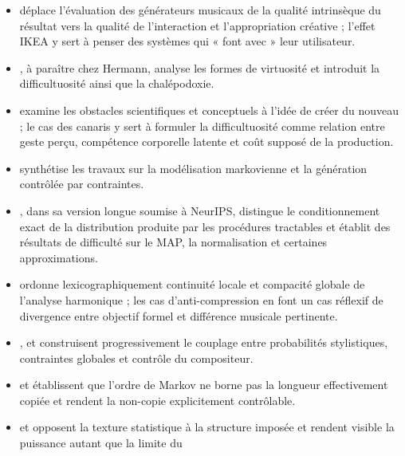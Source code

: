 \documentclass[11pt,a4paper]{article}
\begin{document}
\begin{itemize}
  \item \textcite{pachet2026generation} déplace l'évaluation des générateurs
        musicaux de la qualité intrinsèque du résultat vers la qualité de
        l'interaction et l'appropriation créative ; l'effet IKEA y sert à penser
        des systèmes qui « font avec » leur utilisateur.
  \item \textcite{pachet2027virtuosite}, à paraître chez Hermann, analyse les
        formes de virtuosité et introduit la difficultuosité ainsi que la
        chalépodoxie.
  \item \textcite{pachet2026impossibilite} examine les obstacles scientifiques
        et conceptuels à l'idée de créer du nouveau ; le cas des canaris y sert à
        formuler la difficultuosité comme relation entre geste perçu, compétence
        corporelle latente et coût supposé de la production.
  \item \textcite{pachet2026markov} synthétise les travaux sur la modélisation
        markovienne et la génération contrôlée par contraintes.
  \item \textcite{pachet2026biases}, dans sa version longue soumise à NeurIPS,
        distingue le conditionnement exact de la distribution produite par les
        procédures tractables et établit des résultats de difficulté sur le MAP,
        la normalisation et certaines approximations.
  \item \textcite{pachet2026tonalparsimony} ordonne lexicographiquement continuité
        locale et compacité globale de l'analyse harmonique ; les cas
        d'anti-compression en font un cas réflexif de divergence entre objectif
        formel et différence musicale pertinente.
  \item \textcite{pachet2011markov}, \textcite{barbieri2012lyrics} et
        \textcite{papadopoulos2016flowcomposer} construisent progressivement le
        couplage entre probabilités stylistiques, contraintes globales et contrôle
        du compositeur.
  \item \textcite{papadopoulos2014avoiding} et
        \textcite{papadopoulos2016nonplagiaristic} établissent que l'ordre de
        Markov ne borne pas la longueur effectivement copiée et rendent la
        non-copie explicitement contrôlable.
  \item \textcite{ghedini2015flowmachines} et
        \textcite{pachet2017variations} opposent la texture statistique à la
        structure imposée et rendent visible la puissance autant que la limite du

\end{itemize}
\end{document}
